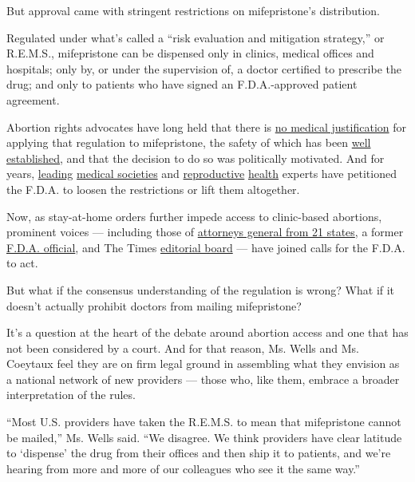 But approval came with stringent restrictions on mifepristone's
distribution.

Regulated under what's called a ``risk evaluation and mitigation
strategy,'' or R.E.M.S., mifepristone can be dispensed only in clinics,
medical offices and hospitals; only by, or under the supervision of, a
doctor certified to prescribe the drug; and only to patients who have
signed an F.D.A.-approved patient agreement.

Abortion rights advocates have long held that there is
\href{https://www.vice.com/en_us/article/vb5vzd/fda-abortion-pill-regulations-controversy}{no
medical justification} for applying that regulation to mifepristone, the
safety of which has been
\href{https://www.nejm.org/doi/full/10.1056/NEJMsb1612526}{well
established}, and that the decision to do so was politically motivated.
And for years,
\href{https://www.aafp.org/dam/AAFP/documents/advocacy/prevention/women/LT-FDA-MifepristoneREMS-062019.pdf}{leading}
\href{https://policysearch.ama-assn.org/policyfinder/detail/mifepristone?uri=\%2FAMADoc\%2FHOD.xml-H-100.948.xml}{medical
societies} and
\href{https://www.nejm.org/doi/full/10.1056/NEJMp1908305}{reproductive}
\href{https://emaaproject.org/}{health} experts have petitioned the
F.D.A. to loosen the restrictions or lift them altogether.

Now, as stay-at-home orders further impede access to clinic-based
abortions, prominent voices --- including those of
\href{https://ag.ny.gov/sites/default/files/final_ag_letter_hhs_medication_abortion_2020.pdf}{attorneys
general from 21 states}, a former
\href{https://thehill.com/opinion/healthcare/494914-the-uk-allows-home-use-of-the-abortion-pill-the-us-should-do-the-same}{F.D.A.
official}, and The Times
\href{https://www.nytimes3xbfgragh.onion/2020/03/26/opinion/abortion-law-coronavirus.html}{editorial
board} --- have joined calls for the F.D.A. to act.

But what if the consensus understanding of the regulation is wrong? What
if it doesn't actually prohibit doctors from mailing mifepristone?

It's a question at the heart of the debate around abortion access and
one that has not been considered by a court. And for that reason, Ms.
Wells and Ms. Coeytaux feel they are on firm legal ground in assembling
what they envision as a national network of new providers --- those who,
like them, embrace a broader interpretation of the rules.

``Most U.S. providers have taken the R.E.M.S. to mean that mifepristone
cannot be mailed,'' Ms. Wells said. ``We disagree. We think providers
have clear latitude to `dispense' the drug from their offices and then
ship it to patients, and we're hearing from more and more of our
colleagues who see it the same way.''

